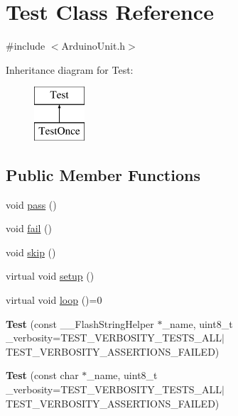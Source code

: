 \hypertarget{class_test}{\section{Test Class Reference}
\label{class_test}
}


{\ttfamily \#include $<$Arduino\-Unit.\-h$>$}

Inheritance diagram for Test\-:\begin{figure}[H]
\begin{center}
\leavevmode
\includegraphics[height=2.000000cm]{class_test}
\end{center}
\end{figure}
\subsection*{Public Member Functions}
\begin{DoxyCompactItemize}
\item 
void \hyperlink{class_test_a34a0e65e4866bfba400f564e9e76a996}{pass} ()
\item 
void \hyperlink{class_test_a5bf0d4600cf540ccd39c12f91e7173de}{fail} ()
\item 
void \hyperlink{class_test_af2ff3082a0ea33fa0c0ae1aae143d786}{skip} ()
\item 
virtual void \hyperlink{class_test_a5eed880dda5138db9b40c6a8c3e6b3c3}{setup} ()
\item 
virtual void \hyperlink{class_test_a62a1398282c8ef41e33e8f35d165f4b0}{loop} ()=0
\item 
\hypertarget{class_test_ac03bf547d000075ff0ea885ef6945fcf}{{\bfseries Test} (const \-\_\-\-\_\-\-Flash\-String\-Helper $\ast$\-\_\-name, uint8\-\_\-t \-\_\-verbosity=T\-E\-S\-T\-\_\-\-V\-E\-R\-B\-O\-S\-I\-T\-Y\-\_\-\-T\-E\-S\-T\-S\-\_\-\-A\-L\-L$|$T\-E\-S\-T\-\_\-\-V\-E\-R\-B\-O\-S\-I\-T\-Y\-\_\-\-A\-S\-S\-E\-R\-T\-I\-O\-N\-S\-\_\-\-F\-A\-I\-L\-E\-D)}\label{class_test_ac03bf547d000075ff0ea885ef6945fcf}

\item 
\hypertarget{class_test_a90dd4b8e36bb8dbc94de88115ead5848}{{\bfseries Test} (const char $\ast$\-\_\-name, uint8\-\_\-t \-\_\-verbosity=T\-E\-S\-T\-\_\-\-V\-E\-R\-B\-O\-S\-I\-T\-Y\-\_\-\-T\-E\-S\-T\-S\-\_\-\-A\-L\-L$|$T\-E\-S\-T\-\_\-\-V\-E\-R\-B\-O\-S\-I\-T\-Y\-\_\-\-A\-S\-S\-E\-R\-T\-I\-O\-N\-S\-\_\-\-F\-A\-I\-L\-E\-D)}\label{class_test_a90dd4b8e36bb8dbc94de88115ead5848}

\end{DoxyCompactItemize}
